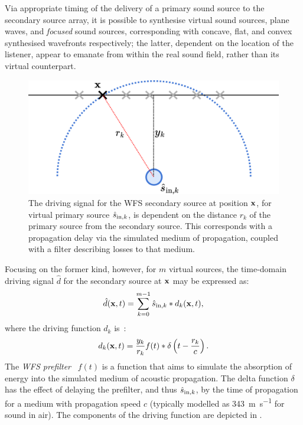 Via appropriate timing of the delivery of a primary sound source to the
secondary source array, it is possible to synthesise virtual sound sources,
plane waves, and \textit{focused} sound sources, corresponding with concave,
flat, and convex synthesised wavefronts respectively; the latter, dependent
on the location of the listener, appear to emanate from within the real
sound field, rather than its virtual counterpart.

\begin{figure}[ht]
    \centering
    \includegraphics[width=.75\textwidth]{figures/wfs_2}
    \caption{
        The driving signal for the WFS secondary source at position $\mathbf{x}$,
        for virtual primary source $\hat{s}_{\text{in},k}$, is dependent on the distance
        $r_k$ of the primary source from the secondary source.
        This corresponds with a propagation delay via the simulated medium of
        propagation, coupled with a filter describing losses to that medium.
    }
    \label{fig:wfs_2}
\end{figure}

Focusing on the former kind, however, for $m$ virtual sources, the time-domain
driving signal $\hat{d}$ for the secondary source at $\mathbf{x}$ may be expressed
as:
\begin{equation}
    \label{eq:driving-signal}
    \hat{d}(\mathbf{x},t) = \sum_{k=0}^{m-1}\hat{s}_{\text{in},k} \ast d_k(\mathbf{x},t),
\end{equation}
where the driving function $d_k$ is~\citep{ahrens_analytic_2012}:
\begin{equation}
    \label{eq:driving-function}
    d_k(\mathbf{x},t) = \frac{y_k}{r_k}f(t) \ast \delta\left(t - \frac{r_k}{c}\right).
\end{equation}
The \textit{WFS prefilter}~\citep{ahrens_analytic_2012} $f(t)$ is a function that
aims to simulate the absorption of energy into the simulated medium
of acoustic propagation.
The delta function $\delta$ has the effect of delaying the prefilter, and thus
$\hat{s}_{\text{in},k}$, by the time of propagation for a medium with propagation speed $c$
(typically modelled as \qty[per-mode=symbol]{343}{\m\per\s} for sound in air).
The components of the driving function are depicted in .
